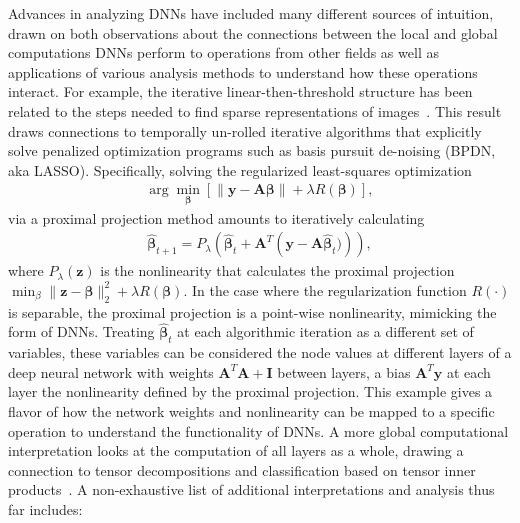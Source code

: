 \documentclass[11pt,lettersize]{article}
\begin{document}
Advances in analyzing DNNs have included many different sources of intuition, drawn on both observations about the connections between the local and global computations DNNs perform to operations from other fields as well as applications of various analysis methods to understand how these operations interact. For example, the iterative linear-then-threshold structure has been related to the steps needed to find sparse representations of images~\cite{borgerding2017amp,xin2016maximal,papyan2016convolutional}. This result draws connections to temporally un-rolled iterative algorithms that explicitly solve penalized optimization programs such as basis pursuit de-noising (BPDN, aka LASSO). Specifically, solving the regularized least-squares optimization
\begin{gather}
\arg\min_{\bm{\beta}} \left[ \left\|\bm{y} - \bm{A}\bm{\beta} \right\| + \lambda R(\bm{\beta})\right],
\end{gather}
via a proximal projection method amounts to iteratively calculating
\begin{gather}
\widehat{\bm{\beta}}_{t+1} = P_{\lambda}\left(\widehat{\bm{\beta}}_{t} + \bm{A}^T\left(\bm{y} - \bm{A}\widehat{\bm{\beta}}_{t}) \right)\right),
\end{gather}
where $P_{\lambda}(\bm{z})$ is the nonlinearity that calculates the proximal projection $\min_{\beta} \|\bm{z} -\bm{\beta}\|_2^2 + \lambda R(\bm{\beta})$. In the case where the regularization function $R(\cdot)$ is separable, the proximal projection is a point-wise nonlinearity, mimicking the form of DNNs. Treating $\widehat{\bm{\beta}}_{t}$ at each algorithmic iteration as a different set of variables, these variables can be considered the node values at different layers of a deep neural network with weights $\bm{A}^T\bm{A} + \bm{I}$ between layers, a bias $\bm{A}^T\bm{y}$ at each layer the nonlinearity defined by the proximal projection. This example gives a flavor of how the network weights and nonlinearity can be mapped to a specific operation to understand the functionality of DNNs. A more global computational interpretation looks at the computation of all layers as a whole, drawing a connection to tensor decompositions and classification based on tensor inner products~\cite{cohen2016convolutional,cohen2017analysis}. A non-exhaustive list of additional interpretations and analysis thus far includes:
\end{document}
